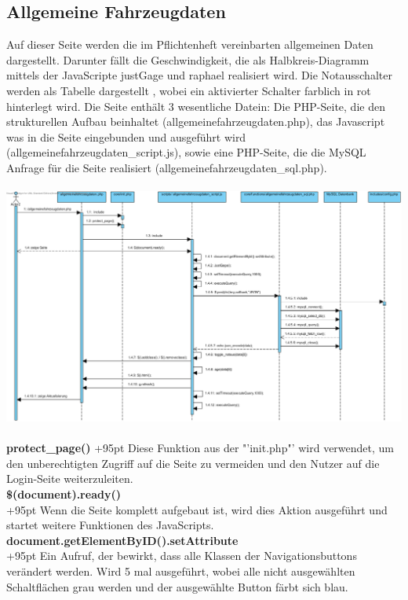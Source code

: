 \documentclass[fontsize = 12pt, paper = a4]{scrreprt}
\begin{document}
\subsection{Allgemeine Fahrzeugdaten}
Auf dieser Seite werden die im Pflichtenheft vereinbarten allgemeinen Daten dargestellt. Darunter fällt die Geschwindigkeit, die als Halbkreis-Diagramm mittels der JavaScripte justGage und raphael realisiert wird. Die Notausschalter werden als Tabelle dargestellt , wobei ein aktivierter Schalter farblich in rot hinterlegt wird. Die Seite enthält 3 wesentliche Datein: Die PHP-Seite, die den strukturellen Aufbau beinhaltet (allgemeinefahrzeugdaten.php), das Javascript was in die Seite eingebunden und ausgeführt wird (allgemeinefahrzeugdaten\_script.js), sowie eine PHP-Seite, die die MySQL Anfrage für die Seite realisiert (allgemeinefahrzeugdaten\_sql.php). 
\\ \\
\includegraphics[scale=0.452]{allgemeinefahrzeugdaten.png}
\\ \\


\textbf{protect\_page()}
\hspace{0.5mm}
\hangindent+95pt  Diese Funktion aus der "'init.php"' wird verwendet, um den unberechtigten Zugriff auf die Seite zu vermeiden und den Nutzer auf die Login-Seite weiterzuleiten.\\


\textbf{\$(document).ready()}\\
\hangindent+95pt  
Wenn die Seite komplett aufgebaut ist, wird dies Aktion ausgeführt und startet weitere Funktionen des JavaScripts. \\


\textbf{document.getElementByID().setAttribute}\\
\hangindent+95pt   
Ein Aufruf, der bewirkt, dass alle Klassen der Navigationsbuttons verändert werden. Wird 5 mal ausgeführt, wobei alle nicht ausgewählten Schaltflächen grau werden und der ausgewählte Button färbt sich blau. \\
\end{document}
